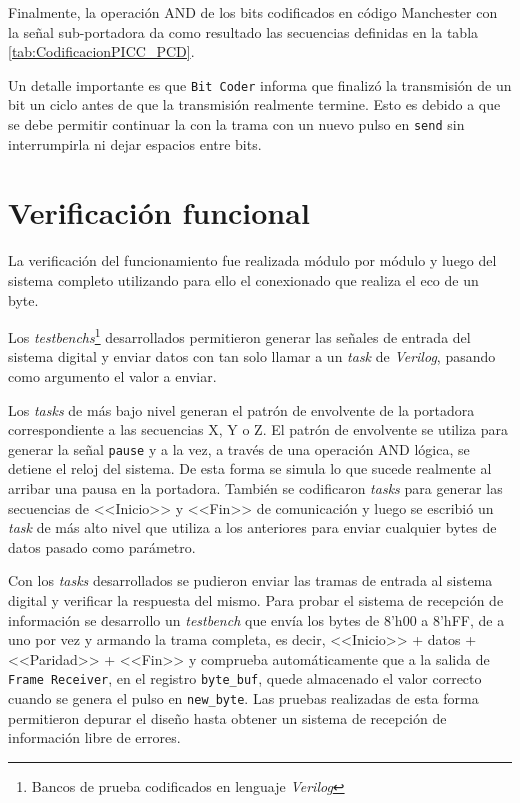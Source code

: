 Finalmente, la operación AND de los bits codificados en código 
Manchester con la señal sub-portadora da como resultado las secuencias 
definidas en la tabla \ref{tab:CodificacionPICC_PCD}. 

Un detalle importante es que \lstinline{Bit Coder} informa que finalizó
la transmisión de un bit un ciclo antes de que la transmisión 
realmente termine. Esto es debido a que se debe permitir continuar 
la con la trama con un nuevo pulso en \lstinline{send} sin 
interrumpirla ni dejar espacios entre bits. 


\section{Verificación funcional}

La verificación del funcionamiento fue realizada módulo por módulo y 
luego del sistema completo utilizando para ello el conexionado que 
realiza el eco de un byte.

Los \emph{testbenchs}\footnote{Bancos de prueba codificados en lenguaje
\emph{Verilog}} desarrollados permitieron generar las señales de 
entrada del sistema digital y enviar datos con tan solo llamar a un 
\emph{task} de \emph{Verilog}, pasando como argumento el valor a 
enviar. 

Los \emph{tasks} de más bajo nivel generan el patrón de envolvente de 
la portadora correspondiente a las secuencias X, Y o Z. El patrón de 
envolvente se utiliza para generar la señal \lstinline{pause} y a la 
vez, a través de una operación AND lógica, se detiene el reloj del 
sistema. De esta forma se simula lo que sucede realmente al arribar 
una pausa en la portadora. También se codificaron \emph{tasks} para 
generar las secuencias de <<Inicio>> y <<Fin>> de comunicación y luego 
se escribió un \emph{task} de más alto nivel que utiliza a los 
anteriores para enviar cualquier bytes de datos pasado como parámetro. 

Con los \emph{tasks} desarrollados se pudieron enviar las tramas de 
entrada al sistema digital y verificar la respuesta del mismo. Para 
probar el sistema de recepción de información se desarrollo un 
\emph{testbench} que envía los bytes de 8'h00 a 8'hFF, de a uno por 
vez y armando la trama completa, es decir, <<Inicio>> + datos + 
<<Paridad>> + <<Fin>> y comprueba automáticamente que a la salida de 
\lstinline{Frame Receiver}, en el registro \lstinline{byte_buf}, quede 
almacenado el valor correcto cuando se genera el pulso en 
\lstinline{new_byte}. Las pruebas realizadas de esta forma permitieron 
depurar el diseño hasta obtener un sistema de recepción de 
información libre de errores.

